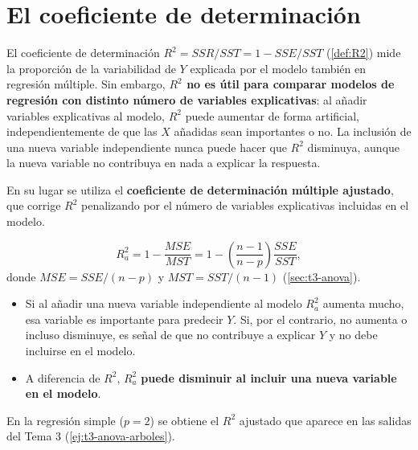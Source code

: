 \section{El coeficiente de determinación}
\label{sec:t6-determinacion}

El coeficiente de determinación $R^2=SSR/SST=1-SSE/SST$ (\cref{def:R2}) mide la proporción de
la variabilidad de $Y$ explicada por el modelo también en regresión múltiple. Sin embargo,
\textbf{$R^2$ no es útil para comparar modelos de regresión con distinto número de variables
explicativas}: al añadir variables explicativas al modelo, $R^2$ puede aumentar de forma
artificial, independientemente de que las $X$ añadidas sean importantes o no. La inclusión de una
nueva variable independiente nunca puede hacer que $R^2$ disminuya, aunque la nueva variable no
contribuya en nada a explicar la respuesta.

En su lugar se utiliza el \textbf{coeficiente de determinación múltiple ajustado}, que corrige
$R^2$ penalizando por el número de variables explicativas incluidas en el modelo.

\begin{definicion}
  \[
    R^2_a = 1-\frac{MSE}{MST} = 1-\left(\frac{n-1}{n-p}\right)\frac{SSE}{SST},
  \]
  donde $MSE=SSE/(n-p)$ y $MST=SST/(n-1)$ (\cref{sec:t3-anova}).
\end{definicion}

\begin{itemize}
  \item Si al añadir una nueva variable independiente al modelo $R^2_a$ aumenta mucho, esa
    variable es importante para predecir $Y$. Si, por el contrario, no aumenta o incluso
    disminuye, es señal de que no contribuye a explicar $Y$ y no debe incluirse en el modelo.
  \item A diferencia de $R^2$, $R^2_a$ \textbf{puede disminuir al incluir una nueva variable en el
    modelo}.
\end{itemize}
En la regresión simple ($p=2$) se obtiene el $R^2$ ajustado que aparece en las salidas del
Tema 3 (\cref{ej:t3-anova-arboles}).
